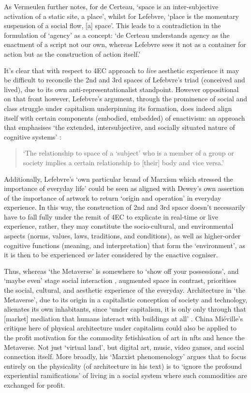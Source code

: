 As Vermeulen further notes, for de Certeau, `space is an inter-subjective activation of a static site, a place', whilst for Lefebvre, `place is the momentary suspension of a social flow, [a] space'. This leads to a contradiction in the formulation of `agency' as a concept: `de Certeau understands agency as the enactment of a script not our own, whereas Lefebvre sees it not as a container for action but as the construction of action itself.' 

It's clear that with respect to 4EC approach to \textit{live} aesthetic experience it may be difficult to reconcile the 2nd and 3rd spaces of Lefebvre's triad (conceived and lived), due to its own anti-representationalist standpoint. However oppositional on that front however, Lefebvre's argument, through the prominence of social and class struggle under capitalism underpinning its formation, does indeed align itself with certain components (embodied, embedded) of enactivism: an approach that emphasises `the extended, intersubjective, and socially situated nature of cognitive systems' \citep[p. 6]{gallagher2017}: 
\begin{quote}
    `The relationship to space of a `subject' who is a member of a group or society implies a certain relationship to [their] body and vice versa.' \cite[p. 40]{lefebvre1991}
\end{quote}
Additionally, Lefebvre's `own particular brand of Marxism which stressed the importance of everyday life' \citep[p. 8]{merrifield1993} could be seen as aligned with Dewey's own assertion of the importance of artwork to return `origin and operation' in everyday experience. In this way, the construction of 2nd and 3rd space doesn't necessarily have to fall fully under the remit of 4EC to explicate in real-time or live experience, rather, they may constitute the socio-cultural, and environmental aspects (norms, values, laws, traditions, and conditions), as well as higher-order cognitive functions (meaning, and interpretation) that form the `environment', as it is then to be experienced \textit{or} later considered by the enactive cogniser.

Thus, whereas `the Metaverse' is somewhere to `show off your possessions', and `maybe even' stage social interaction \citep{marr2022}, augmented space in contrast, prioritises the social, cultural, and aesthetic experience of the everyday. Architecture in `the Metaverse', due to its origin in a capitalistic conception of society and technology, alienates its own inhabitants, since `under capitalism, it is only only through that [market] mediation that humans interact with buildings at all' \citep[p. 18]{mieville1998}. China Miéville's critique here of physical architecture under capitalism could also be applied to the profit motivation for the commodity fetishisation of art in \glspl{nft} and hence the Metaverse. Not just `virtual land', but digital art, music, video games, and social connection itself. More broadly, his `Marxist phenomenology' argues that to focus entirely on the physicality (of architecture in his text) is to `ignore the profound experiential ramifications' of living in a social system where such commodities are exchanged for profit. 

